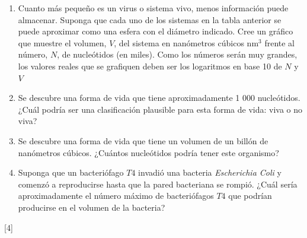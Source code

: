 \documentclass[a4paper]{article}
\newcommand{\nm}{\text{nm}}
\newcounter{problema}
\begin{document}
\begin{problema}
\vspace{5mm}
\begin{enumerate}
	\item Cuanto más pequeño es un virus o sistema vivo, menos información puede almacenar. 
	Suponga que cada uno de los sistemas en la tabla anterior se puede aproximar como una esfera con el diámetro indicado. 
	Cree un gráfico que muestre el volumen, $V$, del sistema en nanómetros cúbicos $\nm^3$ frente al número, $N$, de nucleótidos (en miles). 
	Como los números serán muy grandes, los valores reales que se grafiquen deben ser los logaritmos en base 10 de $N$ y $V$
	\item Se descubre una forma de vida que tiene aproximadamente 1 000 nucleótidos. ¿Cuál podría ser una clasificación plausible para esta forma de vida: viva o no viva?
	\item Se descubre una forma de vida que tiene un volumen de un billón de nanómetros cúbicos. ¿Cuántos nucleótidos podría tener este organismo?
	\item Suponga que un bacteriófago $T4$ invadió una bacteria \textit{Escherichia Coli} y comenzó a reproducirse hasta que la pared bacteriana se rompió. 
	¿Cuál sería aproximadamente el número máximo de bacteriófagos $T4$ que podrían producirse en el volumen de la bacteria?
\end{enumerate}

\end{problema}
[4]  \cite{NASA_AstrobiologyMath}
\end{document}
